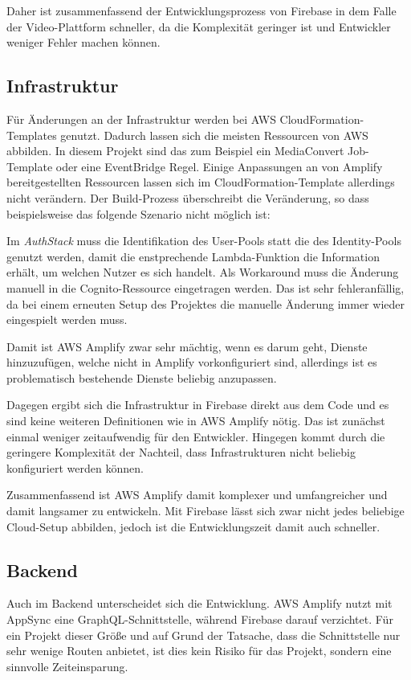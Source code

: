 Daher ist zusammenfassend der Entwicklungsprozess von Firebase in dem Falle der Video-Plattform schneller, da die Komplexität geringer ist und Entwickler weniger Fehler machen können.

\subsection{Infrastruktur}

Für Änderungen an der Infrastruktur werden bei \ac{AWS} CloudFormation-Templates genutzt. Dadurch lassen sich die meisten Ressourcen von \ac{AWS} abbilden. In diesem Projekt sind das zum Beispiel ein MediaConvert Job-Template oder eine EventBridge Regel. Einige Anpassungen an von Amplify bereitgestellten Ressourcen lassen sich im CloudFormation-Template allerdings nicht verändern. Der Build-Prozess überschreibt die Veränderung, so dass beispielsweise das folgende Szenario nicht möglich ist:

Im \textit{AuthStack} muss die Identifikation des User-Pools statt die des Identity-Pools genutzt werden, damit die enstprechende Lambda-Funktion die Information erhält, um welchen Nutzer es sich handelt. Als Workaround muss die Änderung manuell in die Cognito-Ressource eingetragen werden. Das ist sehr fehleranfällig, da bei einem erneuten Setup des Projektes die manuelle Änderung immer wieder eingespielt werden muss.

Damit ist \ac{AWS} Amplify zwar sehr mächtig, wenn es darum geht, Dienste hinzuzufügen, welche nicht in Amplify vorkonfiguriert sind, allerdings ist es problematisch bestehende Dienste beliebig anzupassen.

Dagegen ergibt sich die Infrastruktur in Firebase direkt aus dem Code und es sind keine weiteren Definitionen wie in \ac{AWS} Amplify nötig. Das ist zunächst einmal weniger zeitaufwendig für den Entwickler. Hingegen kommt durch die geringere  Komplexität der Nachteil, dass Infrastrukturen nicht beliebig konfiguriert werden können.

Zusammenfassend ist \ac{AWS} Amplify damit komplexer und umfangreicher und damit langsamer zu entwickeln. Mit Firebase lässt sich zwar nicht jedes beliebige Cloud-Setup abbilden, jedoch ist die Entwicklungszeit damit auch schneller.

\subsection{Backend}

Auch im Backend unterscheidet sich die Entwicklung. \ac{AWS} Amplify nutzt mit AppSync eine GraphQL-Schnittstelle, während Firebase darauf verzichtet. Für ein Projekt dieser Größe und auf Grund der Tatsache, dass die Schnittstelle nur sehr wenige Routen anbietet, ist dies kein Risiko für das Projekt, sondern eine sinnvolle Zeiteinsparung.

